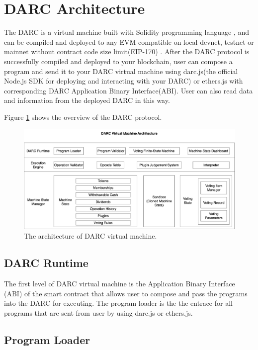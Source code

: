 \documentclass[main.tex]{subfiles}
\begin{document}
\section{DARC Architecture}


The DARC is a virtual machine built with Solidity programming language \cite{soliditylangSolidityx2014}, and can be compiled and deployed to any EVM-compatible on local devnet, testnet or mainnet without contract code size limit(EIP-170) \cite{ethereumEIP170Contract}. After the DARC protocol is successfully compiled and deployed to your blockchain, user can compose a program and send it to your DARC virtual machine using darc.js(the official Node.js SDK for deploying and interacting with your DARC) or ethers.js \cite{ethersDocumentation} with corresponding DARC Application Binary Interface(ABI). User can also read data and information from the deployed DARC in this way.

Figure \ref{fig:architecture} shows the overview of the DARC protocol. 

\begin{figure}
\centering
\includegraphics[width=1\linewidth]{architecture.png}
\caption{\label{fig:architecture}The architecture of DARC virtual machine.}
\end{figure}

\subsection{DARC Runtime}

The first level of DARC virtual machine is the Application Binary Interface (ABI) of the smart contract that allows user to compose and pass the programs into the DARC for executing. The program loader is the the entrace for all programs that are sent from user by using darc.js or ethers.js. 

\subsection{Program Loader}
\end{document}

